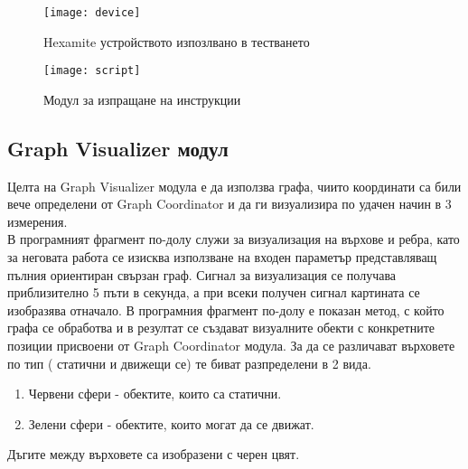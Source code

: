 \begin{figure}
    \centerline{\texttt{[image: device]}}
    \caption{Hexamite устройството изпозлвано в тестването}
    \label{fig:device}
\end{figure}

\begin{figure}
    \centerline{\texttt{[image: script]}}
    \caption{Модул за изпращане на инструкции}
    \label{fig:script}
\end{figure}

\subsection{Graph Visualizer модул}
Целта на Graph Visualizer модула е да използва графа, чиито координати са били вече определени от Graph Coordinator и да ги визуализира по удачен начин в 3 измерения.\\
В програмният фрагмент по-долу служи за визуализация на върхове и ребра, като за неговата работа се изисква използване на входен параметър представляващ пълния ориентиран свързан граф. Сигнал за визуализация се получава приблизително 5 пъти в секунда, а при всеки получен сигнал картината се изобразява отначало. В програмния фрагмент по-долу е показан метод, с който графа се обработва и в резултат се създават визуалните обекти с конкретните позиции присвоени от Graph Coordinator модула. За да се различават върховете по тип ( статични и движещи се) те биват разпределени в 2 вида.

\begin{enumerate}
    \item Червени сфери - обектите, които са статични.
    \item Зелени сфери - обектите, които могат да се движат.
\end{enumerate}

Дъгите между върховете са изобразени с черен цвят.

